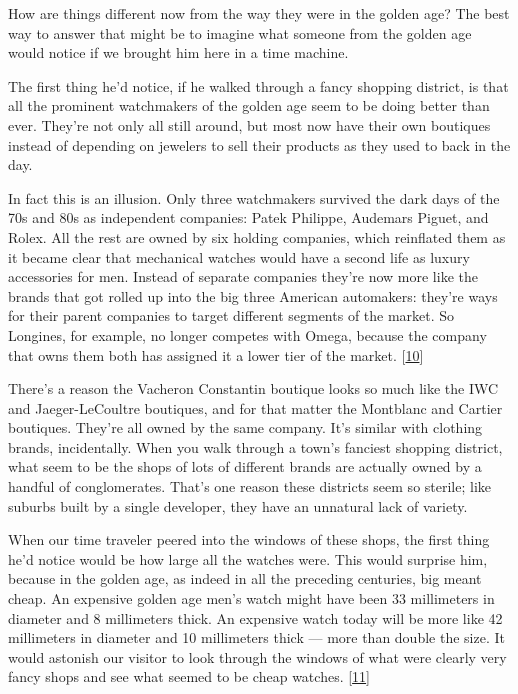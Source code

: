 How are things different now from the way they were in the golden age?
The best way to answer that might be to imagine what someone from the
golden age would notice if we brought him here in a time machine.

The first thing he'd notice, if he walked through a fancy shopping
district, is that all the prominent watchmakers of the golden age seem
to be doing better than ever. They're not only all still around, but
most now have their own boutiques instead of depending on jewelers to
sell their products as they used to back in the day.

In fact this is an illusion. Only three watchmakers survived the dark
days of the 70s and 80s as independent companies: Patek Philippe,
Audemars Piguet, and Rolex. All the rest are owned by six holding
companies, which reinflated them as it became clear that mechanical
watches would have a second life as luxury accessories for men. Instead
of separate companies they're now more like the brands that got rolled
up into the big three American automakers: they're ways for their parent
companies to target different segments of the market. So Longines, for
example, no longer competes with Omega, because the company that owns
them both has assigned it a lower tier of the market.
{[}\hyperref[f10n]{10}{]}

There's a reason the Vacheron Constantin boutique looks so much like the
IWC and Jaeger-LeCoultre boutiques, and for that matter the Montblanc
and Cartier boutiques. They're all owned by the same company. It's
similar with clothing brands, incidentally. When you walk through a
town's fanciest shopping district, what seem to be the shops of lots of
different brands are actually owned by a handful of conglomerates.
That's one reason these districts seem so sterile; like suburbs built by
a single developer, they have an unnatural lack of variety.

When our time traveler peered into the windows of these shops, the first
thing he'd notice would be how large all the watches were. This would
surprise him, because in the golden age, as indeed in all the preceding
centuries, big meant cheap. An expensive golden age men's watch might
have been 33 millimeters in diameter and 8 millimeters thick. An
expensive watch today will be more like 42 millimeters in diameter and
10 millimeters thick --- more than double the size. It would astonish
our visitor to look through the windows of what were clearly very fancy
shops and see what seemed to be cheap watches. {[}\hyperref[f11n]{11}{]}

